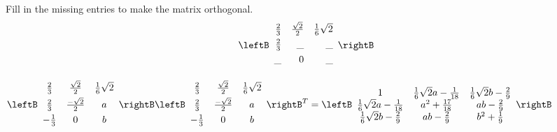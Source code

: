 \begin{enumialphparenastyle}
\begin{ex} Fill in the missing entries to make the matrix orthogonal. 
\begin{equation*}
\leftB 
\begin{array}{rrr}
\vspace{0.05in}\frac{2}{3} & \frac{\sqrt{2}}{2} & \frac{1}{6}\sqrt{2} \\ 
\vspace{0.05in}\frac{2}{3} & \_ & \_ \\ 
\vspace{0.05in}\_ & 0 & \_
\end{array}
\rightB
\end{equation*}
\begin{sol}
$\leftB
\begin{array}{ccc}
\vspace{0.05in}\frac{2}{3} & \frac{\sqrt{2}}{2} & \frac{1}{6}\sqrt{2} \\
\vspace{0.05in}\frac{2}{3} & \frac{-\sqrt{2}}{2} & a \\
-\vspace{0.05in}\frac{1}{3} & 0 & b
\end{array}
\rightB \leftB
\begin{array}{ccc}
\vspace{0.05in}\frac{2}{3} & \frac{\sqrt{2}}{2} & \frac{1}{6}\sqrt{2} \\
\vspace{0.05in}\frac{2}{3} & \frac{-\sqrt{2}}{2} & a \\
-\vspace{0.05in}\frac{1}{3} & 0 & b
\end{array}
\rightB ^{T} = \leftB
\begin{array}{ccc}
1 & \frac{1}{6}\sqrt{2}a-\frac{1}{18} & \frac{1}{6}\sqrt{2}b-\frac{2}{9} \\
\frac{1}{6}\sqrt{2}a-\frac{1}{18} & a^{2}+\frac{17}{18} & ab-\frac{2}{9} \\
\frac{1}{6}\sqrt{2}b-\frac{2}{9} & ab-\frac{2}{9} & b^{2}+\frac{1}{9}
\end{array}
\rightB$ 


\end{sol}
\end{ex}
\end{enumialphparenastyle}
